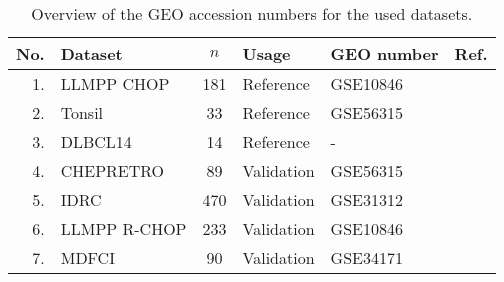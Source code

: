 \begin{table}%
\small
\caption{Overview of the GEO accession numbers for the used datasets.}
\label{table:01}%
\begin{center}
\begin{tabular}{rlclll}
\hline\hline
No. & Dataset & $n$ & Usage & GEO number & Ref.
\\
\hline
1. & LLMPP CHOP & 181 & Reference & GSE10846 & \citep{Lenz2008a}
\\
2. & Tonsil & 33 & Reference & GSE56315 & \citep{Dybkaer2013}
\\
3. & DLBCL14 & 14 & Reference & - & \citep{Falgreen2013c}
\\
4. & CHEPRETRO & 89 & Validation & GSE56315 & \citep{Dybkaer2013}
\\
5. & IDRC & 470 & Validation & GSE31312 & \citep{Visco2012}
\\
6. & LLMPP R-CHOP & 233 & Validation & GSE10846 & \citep{Lenz2008a}
\\
7. & MDFCI & 90 & Validation & GSE34171 & \citep{Monti2012a}\\
\hline
\end{tabular}
\end{center}
\end{table}
